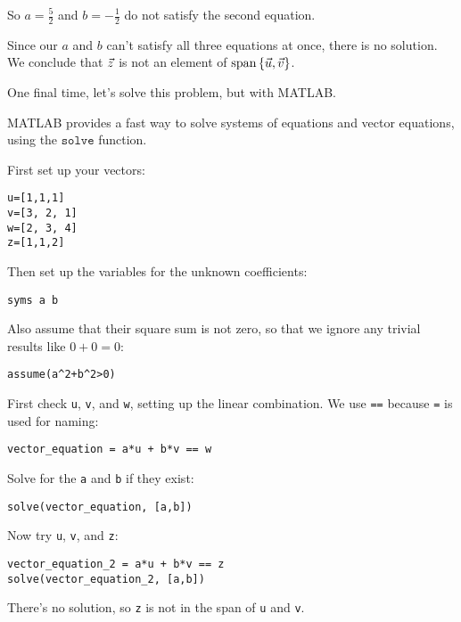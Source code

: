 \documentclass{ximera}
\begin{document}
\begin{exploration}
\begin{example}
\begin{solution}
    So $a=\frac{5}{2}$ and $b=-\frac{1}{2}$ do not satisfy the second equation.

    Since our $a$ and $b$ can't satisfy all three equations at once, there is no solution. We conclude
    that $\vec{z}$ is not an element of
    $\text{span}\left\{\vec{u},\vec{v}\right\}$.
  \end{solution}

  \begin{solution}
  
    One final time, let's solve this problem, but with MATLAB. 

    MATLAB provides a fast way to solve systems of equations and vector equations, using the $\texttt{solve}$ function.

    First set up your vectors:
\begin{verbatim}
u=[1,1,1]
v=[3, 2, 1]
w=[2, 3, 4]
z=[1,1,2]
\end{verbatim}

Then set up the variables for the unknown coefficients:
\begin{verbatim}
syms a b
\end{verbatim}

Also assume that their square sum is not zero, so that we ignore any trivial results like \(0 + 0 = 0\):
\begin{verbatim}
assume(a^2+b^2>0)
\end{verbatim}

First check \verb|u|, \verb|v|, and \verb|w|, setting up the linear combination. We use \verb|==| because \verb|=| is used for naming:
\begin{verbatim}
vector_equation = a*u + b*v == w
\end{verbatim}

Solve for the \verb|a| and \verb|b| if they exist:
\begin{verbatim}
solve(vector_equation, [a,b])
\end{verbatim}

Now try \verb|u|, \verb|v|, and \verb|z|:
\begin{verbatim}
vector_equation_2 = a*u + b*v == z
solve(vector_equation_2, [a,b])
\end{verbatim}

There's no solution, so \verb|z| is not in the span of \verb|u| and \verb|v|.


  \end{solution}
  
\end{example}

\end{exploration}
\end{document}
